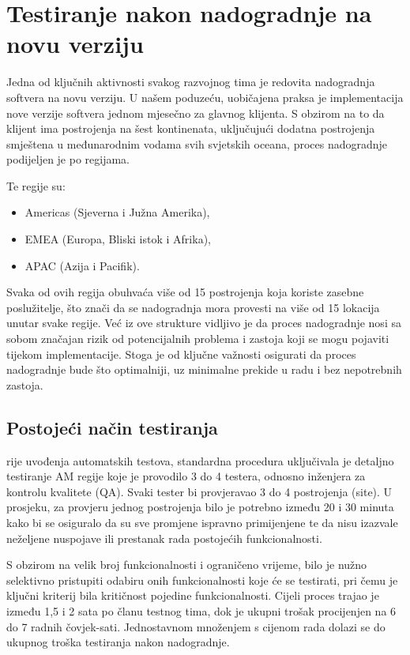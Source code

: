 \chapter{Testiranje nakon nadogradnje na novu verziju}\label{postdeploy}

Jedna od ključnih aktivnosti svakog razvojnog tima je redovita nadogradnja softvera na novu verziju.
U našem poduzeću, uobičajena praksa je implementacija nove verzije softvera jednom mjesečno za glavnog klijenta.
S obzirom na to da klijent ima postrojenja na šest kontinenata, uključujući dodatna postrojenja smještena u međunarodnim vodama svih svjetskih oceana, proces nadogradnje podijeljen je po regijama.

Te regije su:
\begin{itemize}
    \item Americas (Sjeverna i Južna Amerika),
    \item EMEA (Europa, Bliski istok i Afrika),
    \item APAC (Azija i Pacifik).
\end{itemize}

Svaka od ovih regija obuhvaća više od 15 postrojenja koja koriste zasebne poslužitelje, što znači da se nadogradnja mora provesti na više od 15 lokacija unutar svake regije.
Već iz ove strukture vidljivo je da proces nadogradnje nosi sa sobom značajan rizik od potencijalnih problema i zastoja koji se mogu pojaviti tijekom implementacije.
Stoga je od ključne važnosti osigurati da proces nadogradnje bude što optimalniji, uz minimalne prekide u radu i bez nepotrebnih zastoja.

\section{Postojeći način testiranja}\label{current_postdeploy}
rije uvođenja automatskih testova, standardna procedura uključivala je detaljno testiranje AM regije koje je provodilo 3 do 4 testera, odnosno inženjera za kontrolu kvalitete (QA).
Svaki tester bi provjeravao 3 do 4 postrojenja (site).
U prosjeku, za provjeru jednog postrojenja bilo je potrebno između 20 i 30 minuta kako bi se osiguralo da su sve promjene ispravno primijenjene te da nisu izazvale neželjene nuspojave ili prestanak rada postojećih funkcionalnosti.

S obzirom na velik broj funkcionalnosti i ograničeno vrijeme, bilo je nužno selektivno pristupiti odabiru onih funkcionalnosti koje će se testirati, pri čemu je ključni kriterij bila kritičnost pojedine funkcionalnosti.
Cijeli proces trajao je između 1,5 i 2 sata po članu testnog tima, dok je ukupni trošak procijenjen na 6 do 7 radnih čovjek-sati.
Jednostavnom množenjem s cijenom rada dolazi se do ukupnog troška testiranja nakon nadogradnje.

